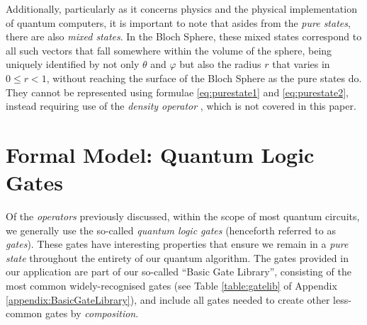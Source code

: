 \documentclass[conference]{IEEEtran}
\begin{document}
Additionally, particularly as it concerns physics and the physical implementation of quantum computers,
it is important to note that asides from the \textit{pure states}, there are also \textit{mixed states}.
In the Bloch Sphere, these mixed states correspond to all such vectors that fall somewhere within the volume of the sphere,
being uniquely identified by not only $\theta$ and $\varphi$ but also the radius $r$ that varies in $0\le r < 1$,
without reaching the surface of the Bloch Sphere as the pure states do. They cannot be represented using formulae
\ref{eq:purestate1} and \ref{eq:purestate2}, instead requiring use of the \textit{density operator} \cite{ref:nmrquantuminformationprocessing},
which is not covered in this paper.

\section{Formal Model: Quantum Logic Gates}

\label{sec:BasicGateLibrary}

Of the \textit{operators} previously discussed, within the scope of most quantum circuits,
we generally use the so-called \textit{quantum logic gates} (henceforth referred to as \textit{gates}).
These gates have interesting properties that
ensure we remain in a \textit{pure state} throughout the entirety of our quantum algorithm.
The gates provided in our application are part of our so-called ``Basic Gate Library'',
consisting of the most common widely-recognised gates \cite{ref:wikipediaquantumlogicgate}
(see Table \ref{table:gatelib} of Appendix \ref{appendix:BasicGateLibrary}),
and include all gates needed to create other less-common gates by \textit{composition}.
\end{document}
